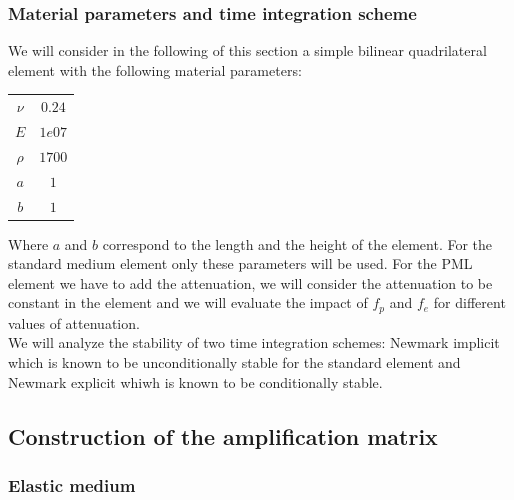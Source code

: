 \subsubsection{Material parameters and time integration scheme}
We will consider in the following of this section a simple bilinear quadrilateral element with the following material parameters:
\begin{table}[H]
\centering
\begin{tabular}{c|c}
$\nu$ & $0.24$ \\
$E$ & $1e07$ \\
$\rho$ & $1700$ \\
$a$ & $1$ \\
$b$ & $1$
\end{tabular}
\end{table} 
Where $a$ and $b$ correspond to the length and the height of the element.
For the standard medium element only these parameters will be used. For the PML element we have to add the attenuation, we will consider the attenuation to be constant in the element and we will evaluate the impact of $f_p$ and $f_e$ for different values of attenuation.\\
We will analyze the stability of two time integration schemes: Newmark implicit which is known to be unconditionally stable for the standard element and Newmark explicit whiwh is known to be conditionally stable. 
\subsection{Construction of the amplification matrix}
\subsubsection{Elastic medium}

